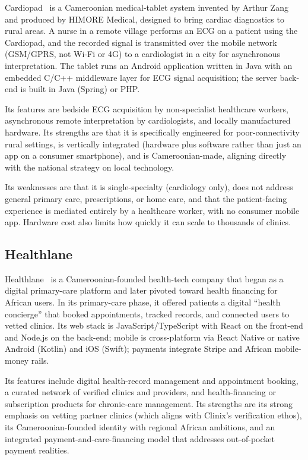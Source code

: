 Cardiopad~\cite{cardiopad} is a Cameroonian medical-tablet system invented by Arthur Zang and produced by HIMORE Medical, designed to bring cardiac diagnostics to rural areas. A nurse in a remote village performs an ECG on a patient using the Cardiopad, and the recorded signal is transmitted over the mobile network (GSM/GPRS, not Wi-Fi or 4G) to a cardiologist in a city for asynchronous interpretation. The tablet runs an Android application written in Java with an embedded C/C++ middleware layer for ECG signal acquisition; the server back-end is built in Java (Spring) or PHP.

Its features are bedside ECG acquisition by non-specialist healthcare workers, asynchronous remote interpretation by cardiologists, and locally manufactured hardware. Its strengths are that it is specifically engineered for poor-connectivity rural settings, is vertically integrated (hardware plus software rather than just an app on a consumer smartphone), and is Cameroonian-made, aligning directly with the national strategy on local technology.

Its weaknesses are that it is single-specialty (cardiology only), does not address general primary care, prescriptions, or home care, and that the patient-facing experience is mediated entirely by a healthcare worker, with no consumer mobile app. Hardware cost also limits how quickly it can scale to thousands of clinics.

\subsection{Healthlane}

Healthlane~\cite{healthlane} is a Cameroonian-founded health-tech company that began as a digital primary-care platform and later pivoted toward health financing for African users. In its primary-care phase, it offered patients a digital ``health concierge'' that booked appointments, tracked records, and connected users to vetted clinics. Its web stack is JavaScript/TypeScript with React on the front-end and Node.js on the back-end; mobile is cross-platform via React Native or native Android (Kotlin) and iOS (Swift); payments integrate Stripe and African mobile-money rails.

Its features include digital health-record management and appointment booking, a curated network of verified clinics and providers, and health-financing or subscription products for chronic-care management. Its strengths are its strong emphasis on vetting partner clinics (which aligns with Clinix's verification ethos), its Cameroonian-founded identity with regional African ambitions, and an integrated payment-and-care-financing model that addresses out-of-pocket payment realities.

